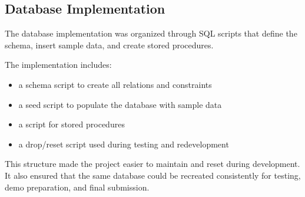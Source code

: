 \subsection{Database Implementation}

The database implementation was organized through SQL scripts that define the schema, insert sample data, and create stored procedures.

The implementation includes:
\begin{itemize}
    \item a schema script to create all relations and constraints
    \item a seed script to populate the database with sample data
    \item a script for stored procedures
    \item a drop/reset script used during testing and redevelopment
\end{itemize}
\nopagebreak[4]

\noindent This structure made the project easier to maintain and reset during development. It also ensured that the same database could be recreated consistently for testing, demo preparation, and final submission.


